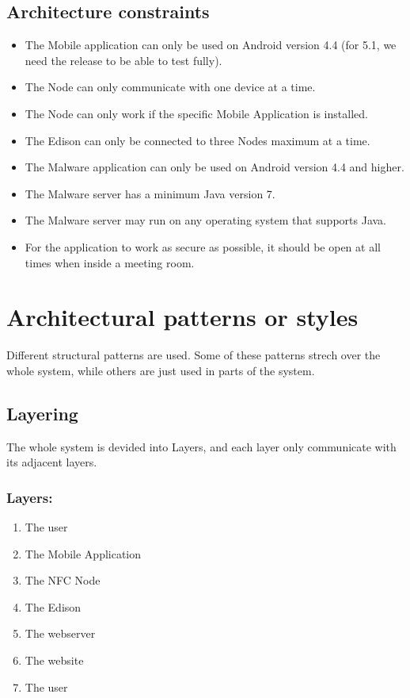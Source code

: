\documentclass[a4paper,12pt,titlepage]{article}
\begin{document}
\subsection{Architecture constraints}
	\begin{itemize}
		\item The Mobile application can only be used on Android version 4.4 (for 5.1, we need the release to be able to test fully).
		\item The Node can only communicate with one device at a time.
		\item The Node can only work if the specific Mobile Application is installed.
		\item The Edison  can only be connected to three Nodes maximum at a time.
		\item The Malware application can only be used on Android version 4.4 and higher.
		\item The Malware server has a minimum Java version 7.
		\item The Malware server may run on any operating system that supports Java.
		\item For the application to work as secure as possible, it should be open at all times when inside a meeting room.

	\end{itemize}
\newpage	\section{Architectural patterns or styles}
Different structural patterns are used. Some of these patterns strech over the whole system, while others are just used in parts of the system.
\subsection{Layering}The whole system is devided into Layers, and each layer only communicate with its adjacent layers.
\subsubsection{Layers:}
\begin{enumerate}
\item The user
\item The Mobile Application
\item The NFC Node
\item The Edison
\item The webserver
\item The website
\item The user
\end{enumerate}
\end{document}
